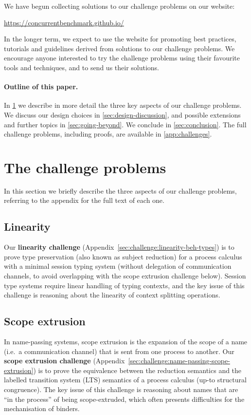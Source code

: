 \documentclass[runningheads]{llncs}
\begin{document}
We have begun collecting solutions to our challenge problems on our website:
%
\begin{center}
  \url{https://concurrentbenchmark.github.io/}
\end{center}
%
In the longer term, we expect to use the website for promoting best practices,
tutorials and guidelines derived from solutions to our challenge problems.
We encourage anyone interested to try the challenge problems using their
favourite tools and techniques, and to send us their solutions.

\paragraph{Outline of this paper.}
In \cref{sec:challenge-problems} we describe in more detail the three key
aspects of our challenge problems.  We discuss our design choices in
\cref{sec:design-discussion}, and possible extensions and further topics in
\cref{sec:going-beyond}.  We conclude in \cref{sec:conclusion}.
The full challenge problems, including proofs, are available in \cref{app:challenges}.

\section{The challenge problems}\label{sec:challenge-problems}
In this section we briefly describe the three aspects of our challenge problems, referring to the appendix for the full text of each one.

\subsection{Linearity}
Our \textbf{linearity challenge} (Appendix~\ref{sec:challenge:linearity-beh-types}) is to prove type preservation (also known as subject reduction) for a process calculus with a minimal
session typing system (without delegation of communication channels, to avoid overlapping with the scope
extrusion challenge below).
Session type systems require linear handling of typing contexts, and the key
issue of this challenge is reasoning about the linearity of context splitting operations.

\subsection{Scope extrusion}
In name-passing systems, scope extrusion is the expansion of the scope of a name (i.e.~a communication channel) that is sent from one process to another.
Our \textbf{scope extrusion challenge} (Appendix~\ref{sec:challenge:name-passing-scope-extrusion}) is to prove the equivalence between the reduction semantics and the labelled transition system (LTS) semantics of a process calculus (up-to structural congruence).
The key issue of this challenge is reasoning about names that are ``in the process'' of being scope-extruded, which often presents difficulties for the mechanisation of binders.
\end{document}
